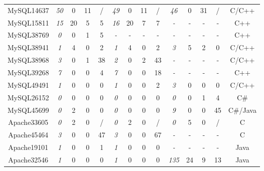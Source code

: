 \begin{table}[tb!]
\begin{adjustwidth}{-.75in}{-.75in}
{\begin{tabular}{cccccccccccccc}
\midrule                                                                                                                                         
MySQL14637     & {\it 50}     & 0      & 11     & /      & {\it 49}     & 0      & 11     & /      & {\it 46 }    & 0      & 31     & /      & C/C++	\\
MySQL15811     & {\it 15}     & 20     & 5      & 5      & {\it 16}     & 20     & 7      & 7      & {\it -  }    & -      & -      & -      & C++	\\ 
MySQL38769     & {\it  0}     & 0      & 1      & 5      & {\it - }     & -      & -      & -      & {\it -  }    & -      & -      & -      & C++	\\ 
MySQL38941     & {\it  1}     & 4      & 0      & 2      & {\it 1 }     & 4      & 0      & 2      & {\it 3  }    & 5      & 2      & 0      & C/C++	\\
MySQL38968     & {\it  3}     & 0      & 1      & 38     & {\it 2 }     & 0      & 2      & 43     & {\it -  }    & -      & -      & -      & C/C++	\\
MySQL39268     & {\it 7 }     & 0      & 0      & 4      & {\it 7 }     & 0      & 0      & 18     & {\it -  }    & -      & -      & -      & C++	\\ 
MySQL49491     & {\it 1 }     & 0      & 0      & 0      & {\it 1 }     & 0      & 0      & 2      & {\it 3  }    & 0      & 0      & 0      & C/C++	\\
MySQL26152     & {\it  0}     & 0      & 0      & 0      & {\it 0 }     & 0      & 0      & 0      & {\it 0  }    & 0      & 1      & 4      & C\#	\\ 
MySQL45699     & {\it  0}     & 2      & 0      & 0      & {\it 0 }     & 0      & 0      & 0      & {\it 9  }    & 0      & 0      & 45     & C\#/Java	\\
\midrule
Apache33605    & {\it  0}     & 2      & 0      & /      & {\it 0 }     & 2      & 0      & /      & {\it 0  }    & 5      & 0      & /      & C  	\\
Apache45464    & {\it  3}     & 0      & 0      & 47     & {\it 3 }     & 0      & 0      & 67     & {\it -  }    & -      & -      & -      & C	\\ 
Apache19101    & {\it  1}     & 0      & 0      & 1      & {\it 1 }     & 0      & 0      & 0      & {\it -  }    & -      & -      & -      & Java	\\
Apache32546    & {\it  1}     & 0      & 0      & 0      & {\it 1 }     & 0      & 0      & 0      & {\it 135}    & 24     & 9      & 13     & Java	\\

\end{tabular}}
\end{adjustwidth}
\end{table}
